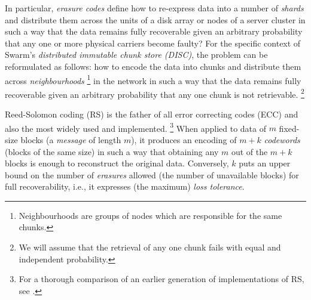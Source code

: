 \documentclass[manuscript,screen,review]{acmart}
\begin{document}
In particular, \emph{erasure codes} define how to re-express data into a number of \textit{shards} and distribute them across the units of a disk array or nodes of a server cluster in such a way that the data remains fully recoverable given an arbitrary probability that any one or more physical carriers become faulty?
For the specific context of Swarm's \emph{distributed immutable chunk store (DISC)}, the problem can be reformulated as follows: how to encode the data into chunks and distribute them across \textit{neighbourhoods}%
%
\footnote{Neighbourhoods are groups of nodes which are responsible for the same chunks.}
%
in the network in such a way that the data remains fully recoverable given an arbitrary probability that any one chunk is not retrievable.%
%
\footnote{We will assume that the retrieval of any one chunk fails with equal and independent probability.}

Reed-Solomon coding (RS)  \citep{reed1960polynomial,lubyetal1995CRS,plank2006optimizing,li2013erasure}
is the father of all  error correcting codes (ECC) and also the most widely used and implemented.%
%
\footnote{%
For a thorough comparison of an earlier generation of implementations of RS, see \citet{plank2009performance}.}
%
When applied to data of $m$ fixed-size blocks (a \emph{message} of length $m$), it produces an encoding of $m+k$ \emph{codewords} (blocks of the same size) in such a way that obtaining any $m$ out of the $m+k$ blocks is enough to reconstruct the original data. Conversely, $k$ puts an upper bound on the number of \emph{erasures} allowed (the number of unavailable blocks) for full recoverability, i.e., it expresses (the maximum) \emph{loss tolerance}.
\end{document}
